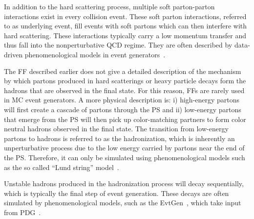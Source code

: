 In addition to the hard scattering process, multiple soft parton-parton interactions exist in every collision event. These soft parton interactions, referred to as underlying event, fill events with soft partons which can then interfere with hard scattering. These interactions typically carry a low momentum transfer and thus fall into the nonperturbative \ac{QCD} regime. They are often described by data-driven phenomenological models in event generators~\cite{Sjostrand:2014zea}.

The \ac{FF} described earlier does not give a detailed description of the mechanism by which partons produced in hard scatterings or heavy particle decays form the hadrons that are observed in the final state. For this reason, \acp{FF} are rarely used in \ac{MC} event generators. A more physical description is: i) high-energy partons will first create a cascade of partons through the \ac{PS} and ii) low-energy partons that emerge from the \ac{PS} will then pick up color-matching partners to form color neutral hadrons observed in the final state. The transition from low-energy partons to hadrons is referred to as the hadronization, which is inherently an unperturbative process due to the low energy carried by partons near the end of the \ac{PS}. Therefore, it can only be simulated using phenomenological models such as the so called  ``Lund string'' model~\cite{Andersson:1983ia}.

Unstable hadrons produced in the hadronization process will decay sequentially, which is typically the final step of event generation. These decays are often simulated by phenomenological models, such as the EvtGen~\cite{Lange:2001uf}, which take input from \ac{PDG}~\cite{ParticleDataGroup:2022pth}.